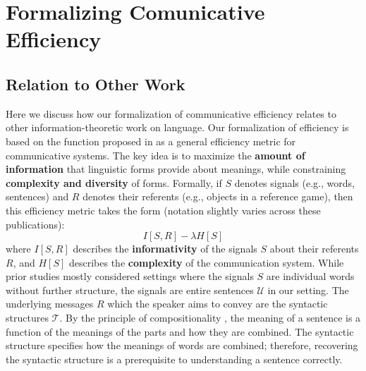 \documentclass[10pt,twoside,lineno]{article}
\newcommand{\key}[1]{\textbf{#1}}
\newcommand{\utterance}{\mathcal{U}}
\newcommand{\tree}{\mathcal{T}}
\begin{document}
\section{Formalizing Comunicative Efficiency}
\subsection{Relation to Other Work}



Here we discuss how our formalization of communicative efficiency relates to other information-theoretic work on language.
Our formalization of efficiency is based on the function proposed in \cite{ferreri2003least,ferrericancho2007global,futrell2017memory,peloquin2019interactions} as a general efficiency metric for communicative systems.
The key idea is to maximize the \key{amount of information} that linguistic forms provide about meanings, while constraining \key{complexity and diversity} of forms. %
Formally, if $S$ denotes signals (e.g., words, sentences) and $R$ denotes their referents (e.g., objects in a reference game), then this efficiency metric takes the form (notation slightly varies across these publications):
\begin{equation}\label{eq:eff-general}
I[S, R] - \lambda H[S]
\end{equation}
where $I[S, R]$ describes the \key{informativity} of the signals $S$ about their referents $R$, and $H[S]$ describes the \key{complexity} of the communication system.
While prior studies \cite{ferreri2003least, kemp2012kinship,regier2015word,zaslavsky2018efficient} mostly considered settings where the signals $S$ are individual words without further structure, the signals are entire sentences $\utterance$ in our setting.
The underlying messages $R$ which the speaker aims to convey are the syntactic structures $\tree$.
By the principle of compositionality \cite{frege1892sinn}, the meaning of a sentence is a function of the meanings of the parts and how they are combined.
The syntactic structure specifies how the meanings of words are combined; therefore, recovering the syntactic structure is a prerequisite to understanding a sentence correctly.
\end{document}
